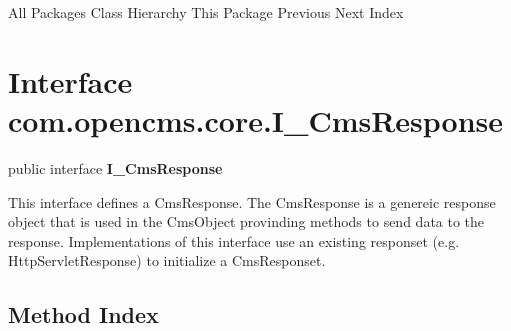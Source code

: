 \begin{PRE}
All Packages  Class Hierarchy  This Package  Previous  Next  Index
\end{PRE}

\htmlHR

\section{  Interface com.opencms.core.I\_CmsResponse }

\begin{description}
\item public interface {\bf I\_CmsResponse} 
\end{description}

This interface defines a CmsResponse. The CmsResponse is a genereic response
object that is used in the CmsObject provinding methods to send data to the
response. Implementations of this interface use an existing responset (e.g.
HttpServletResponse) to initialize a CmsResponset. 

\htmlHR

\subsection*{  Method Index }

